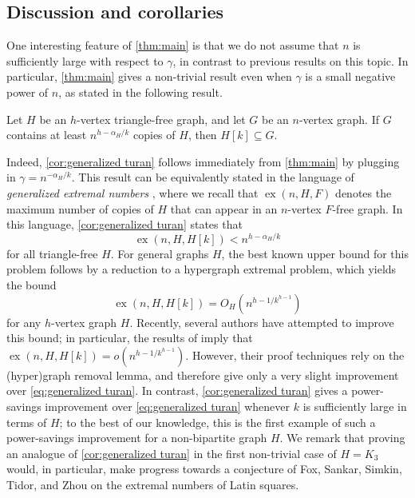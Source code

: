 \documentclass[11pt]{article}
\numberwithin{equation}{section}
\theoremstyle{plain}
\theoremstyle{remark}
\DeclareMathOperator\ex{ex}
\begin{document}
\subsection{Discussion and corollaries}
One interesting feature of \cref{thm:main} is that we do not assume that $n$ is sufficiently large with respect to $\gamma$, in contrast to previous results on this topic. In particular, \cref{thm:main} gives a non-trivial result even when $\gamma$ is a small negative power of $n$, as stated in the following result.
\begin{corollary}\label{cor:generalized turan}
    Let $H$ be an $h$-vertex triangle-free graph, and let $G$ be an $n$-vertex graph. If $G$ contains at least $n^{h-\alpha_H/k}$ copies of $H$, then $H[k] \subseteq G$.
\end{corollary}
Indeed, \cref{cor:generalized turan} follows immediately from \cref{thm:main} by plugging in $\gamma = n^{-\alpha_H/k}$. This result can be equivalently stated in the language of \emph{generalized extremal numbers} \cite{MR3548290}, where we recall that $\ex(n, H, F)$ denotes the maximum number of copies of $H$ that can appear in an $n$-vertex $F$-free graph. In this language, \cref{cor:generalized turan} states that $$\ex(n,H,H[k]) < n^{h-\alpha_H/k}$$ for all triangle-free $H$. For general graphs $H$, the best known upper bound for this problem follows by a reduction to a hypergraph extremal problem, which yields the bound
\begin{equation}\label{eq:generalized turan}
\ex(n,H,H[k]) = O_H\left(n^{h - 1/k^{h-1}}\right)
\end{equation}
for any $h$-vertex graph $H$. Recently, several authors \cite{2402.16818,2405.07763,MR4546048} have attempted to improve this bound; in particular, the results of \cite{2402.16818,2405.07763} imply that $\ex(n,H,H[k]) = o(n^{h-1/k^{h-1}})$. However, their proof techniques rely on the (hyper)graph removal lemma, and therefore give only a very slight improvement over \eqref{eq:generalized turan}. In contrast, \cref{cor:generalized turan} gives a power-savings improvement over \eqref{eq:generalized turan} whenever $k$ is sufficiently large in terms of $H$; to the best of our knowledge, this is the first example of such a power-savings improvement for a non-bipartite graph $H$. We remark that proving an analogue of \cref{cor:generalized turan} in the first non-trivial case of $H=K_3$ would, in particular, make progress towards a conjecture of Fox, Sankar, Simkin, Tidor, and Zhou \cite[Conjecture 6.4]{2401.00359} on the extremal numbers of Latin squares. 
\end{document}
